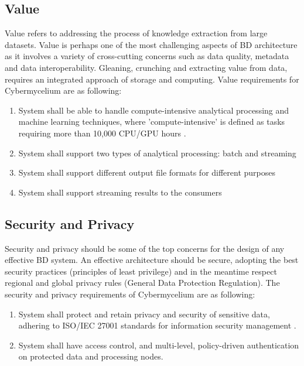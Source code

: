 \documentclass[review]{elsarticle}
\begin{document}
\subsection{Value}

Value refers to addressing the process of knowledge extraction from large datasets. Value is perhaps one of the most challenging aspects of BD architecture as it involves a variety of cross-cutting concerns such as data quality, metadata and data interoperability. Gleaning, crunching and extracting value from data, requires an integrated approach of storage and computing. Value requirements for Cybermycelium are as following:

\begin{enumerate}[label=\textbf{Val-\arabic*}]
    \item System shall be able to handle compute-intensive analytical processing and machine learning techniques, where 'compute-intensive' is defined as tasks requiring more than 10,000 CPU/GPU hours \cite{warren2015big}.
    \item System shall support two types of analytical processing: batch and streaming
    \item System shall support different output file formats for different purposes
    \item System shall support streaming results to the consumers 
\end{enumerate}

\subsection{Security and Privacy}

Security and privacy should be some of the top concerns for the design of any effective BD system. An effective architecture should be secure, adopting the best security practices (principles of least privilege) and in the meantime respect regional and global privacy rules (General Data Protection Regulation). The security and privacy requirements of Cybermycelium are as following:

\begin{enumerate}[label=\textbf{SaP-\arabic*}]
    \item System shall protect and retain privacy and security of sensitive data, adhering to ISO/IEC 27001 standards for information security management \cite{disterer2013iso}.
    \item System shall have access control, and multi-level, policy-driven authentication on protected data and processing nodes.
\end{enumerate}
\end{document}
